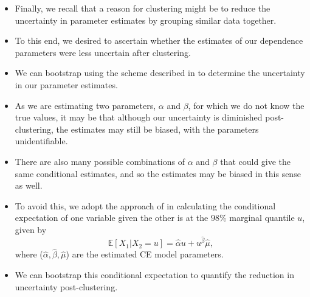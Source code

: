 \documentclass{article}
\numberwithin{equation}{section}
\begin{document}

\begin{itemize}
  \item Finally, we recall that a reason for clustering might be to reduce the uncertainty in parameter estimates by grouping similar data together.
  \item To this end, we desired to ascertain whether the estimates of our dependence parameters were less uncertain after clustering.
  \item We can bootstrap using the scheme described in \cite{Heffernan2004} to determine the uncertainty in our parameter estimates. 
  \item As we are estimating two parameters, $\alpha$ and $\beta$, for which we do not know the true values, it may be that although our uncertainty is diminished post-clustering, the estimates may still be biased, with the parameters unidentifiable.
  \item There are also many possible combinations of $\alpha$ and $\beta$ that could give the same conditional estimates, and so the estimates may be biased in this sense as well.
  \item To avoid this, we adopt the approach of \cite{Richards2021-qm} in calculating the conditional expectation of one variable given the other is at the $98\%$ marginal quantile $u$, given by
  \begin{equation}
    \mathbb{E}[X_1 | X_2 = u] = \hat{\alpha} u + u^{\hat{\beta}} \hat{\mu},
  \end{equation}
  where ($\hat{\alpha}, \hat{\beta}, \hat{\mu}$) are the estimated CE model parameters.
  \item We can bootstrap this conditional expectation to quantify the reduction in uncertainty post-clustering. 
\end{itemize}
\end{document}
